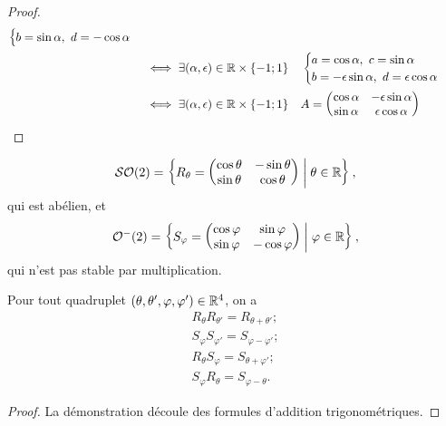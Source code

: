 \begin{proof}
\begin{align*}
\begin{cases}
        b=\sin\alpha, \ d=-\cos\alpha \end{cases} \\
        &\iff \exists (\alpha, \epsilon) \in \mathbb{R} \times \{-1; 1\} \quad 
        \begin{cases} a=\cos\alpha, \ c=\sin\alpha \\ 
        b=-\epsilon\sin\alpha, \ d=\epsilon\cos\alpha \end{cases}\\
        &\iff \exists (\alpha, \epsilon) \in \mathbb{R} \times \{-1; 1\} \quad 
        A=\begin{pmatrix} \cos \alpha & -\epsilon\sin\alpha \\ \sin\alpha 
        & \epsilon\cos\alpha\end{pmatrix}
    \end{align*}
\end{proof}
\begin{theo}
  \begin{equation}
    \mathcal{SO}\!\left(2\right) = \left\{R_\theta=\begin{pmatrix}\cos\theta & -\sin\theta \\ 
    \sin\theta & \cos\theta\end{pmatrix}\mathrel{}\middle|\mathrel{}\theta \in \mathbb{R}\right\},
  \end{equation}
  qui est abélien, et
  \begin{equation}
    \mathcal{O}^{-}\!\left(2\right) = \left\{S_\varphi=\begin{pmatrix}\cos\varphi & \sin\varphi 
    \\ \sin\varphi & -\cos\varphi \end{pmatrix}\mathrel{}\middle|\mathrel{}\varphi \in \mathbb{R}\right\},
  \end{equation}
  qui n'est pas stable par multiplication.
\end{theo}
\begin{theo}
  Pour tout quadruplet \((\theta, \theta', \varphi, \varphi') \in \mathbb{R}^4\), on 
  a
  \begin{gather}
    R_\theta R_{\theta'} = R_{\theta+\theta'}; \\
    S_\varphi S_{\varphi'} = S_{\varphi-\varphi'}; \\
    R_\theta S_\varphi = S_{\theta+\varphi'}; \\
    S_\varphi R_\theta = S_{\varphi-\theta}.
  \end{gather}
\end{theo}
\begin{proof}
  La démonstration découle des formules d'addition trigonométriques.
\end{proof}
